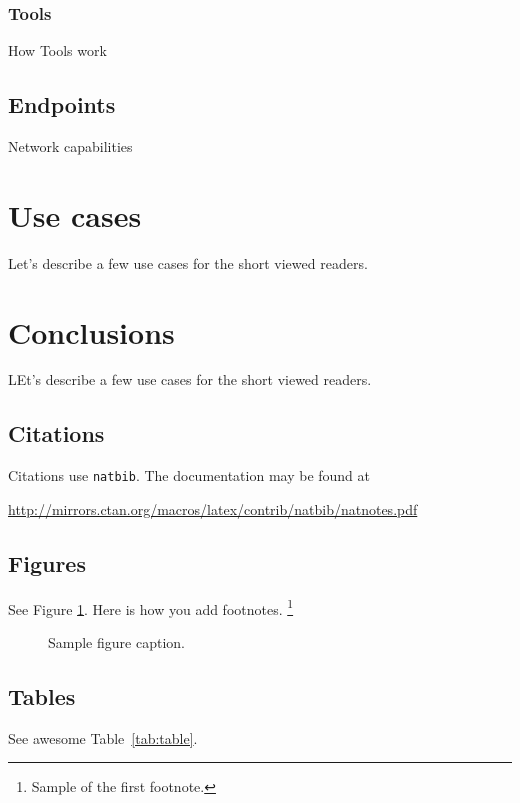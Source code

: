 \documentclass{article}
\begin{document}
\subsubsection{Tools}
How Tools work

\subsection{Endpoints}
Network capabilities

\section{Use cases}
Let's describe a few use cases for the short viewed readers.

\section{Conclusions}
LEt's describe a few use cases for the short viewed readers.

\subsection{Citations}
Citations use \verb+natbib+. The documentation may be found at
\begin{center}
	\url{http://mirrors.ctan.org/macros/latex/contrib/natbib/natnotes.pdf}
\end{center}


\subsection{Figures}
\lipsum[10]
See Figure \ref{fig:fig1}. Here is how you add footnotes. \footnote{Sample of the first footnote.}
\lipsum[11]

\begin{figure}
	\centering
	\fbox{\rule[-.5cm]{4cm}{4cm} \rule[-.5cm]{4cm}{0cm}}
	\caption{Sample figure caption.}
	\label{fig:fig1}
\end{figure}

\subsection{Tables}
See awesome Table~\ref{tab:table}.
\end{document}

